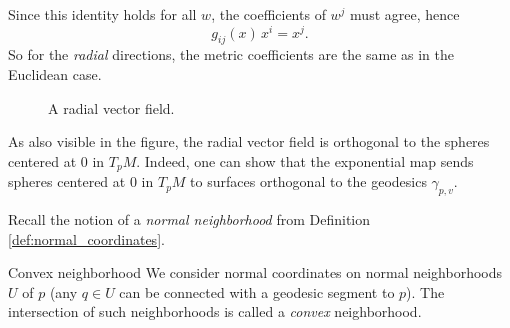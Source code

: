 Since this identity holds for all $w$, the coefficients of $w^j$ must agree, hence
\begin{equation}
    \label{eq:gauss_lemma_radial_vector_field}
    g_{ij}(x)\, x^i = x^j.
\end{equation}
So for the \emph{radial} directions, the metric coefficients are the same as in the Euclidean case.




\begin{figure}[H]
\begin{center}
\end{center}
\caption{A radial vector field.}
\end{figure}


\begin{colremark}
    As also visible in the figure, the radial vector field is orthogonal to the spheres centered at $0$ in $T_p M$. Indeed, one can show that the exponential map sends spheres centered at $0$ in $T_p M$ to surfaces orthogonal to the geodesics $\gamma_{p,v}$.
\end{colremark}

Recall the notion of a \emph{normal neighborhood} from Definition \ref{def:normal_coordinates}.

\begin{colordef}{Convex neighborhood}{}
We consider normal coordinates on normal neighborhoods $U$ of $p$ (any $q \in U$ can be connected with a geodesic segment to $p$). The intersection of such neighborhoods is called a \emph{convex} neighborhood.
\end{colordef}








